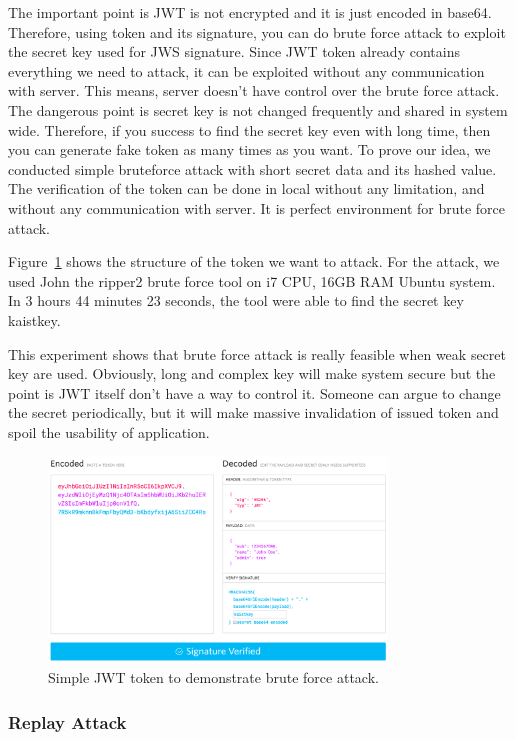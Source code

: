\documentclass[journal,article,submit,moreauthors,pdftex,10pt,a4paper]{mdpi}
\begin{document}
The important point is JWT is not encrypted and it is just encoded in base64. Therefore, using token and its signature, you can do brute force attack to exploit the secret key used for JWS signature. Since JWT token already contains everything we need to attack, it can be exploited without any communication with server. This means, server doesn't have control over the brute force attack. The dangerous point is secret key is not changed frequently and shared in system wide. Therefore, if you success to find the secret key even with long time, then you can generate fake token as many times as you want. To prove our idea, we conducted simple bruteforce attack with short secret data and its hashed value. The verification of the token can be done in local without any limitation, and without any communication with server. It is perfect environment for brute force attack.

Figure~\ref{bruteforce} shows the structure of the token we want to attack. For the attack, we used John the ripper2 %
brute force tool on i7 CPU, 16GB RAM Ubuntu system. In 3 hours 44 minutes 23 seconds, the tool were able to find the secret key kaistkey.

This experiment shows that brute force attack is really feasible when weak secret key are used. Obviously, long and complex key will make system secure but the point is JWT itself don't have a way to control it. Someone can argue to change the secret periodically, but it will make massive invalidation of issued token and spoil the usability of application.
\begin{figure}[H]
\centering
\includegraphics[width=9cm]{figures/bruteforce}
\caption{Simple JWT token to demonstrate brute force attack.}
\label{bruteforce}
\end{figure}

\subsubsection{Replay Attack}
\end{document}
